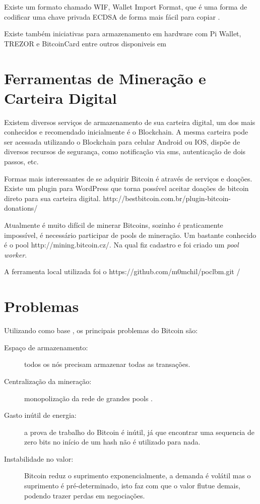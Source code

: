 \documentclass[a4paper,11pt]{article}
\theoremstyle{mytheor}
\begin{document}
Existe um formato chamado WIF, Wallet Import Format, que é uma forma de codificar uma chave privada ECDSA de forma mais fácil para copiar \cite{wif}. 

Existe também iniciativas para armazenamento em hardware com Pi Wallet, TREZOR e BitcoinCard entre outros disponiveis em \cite{hardWallet}

\section{Ferramentas de Mineração e Carteira Digital}

Existem diversos serviços de armazenamento de sua carteira digital, um dos mais conhecidos e recomendado inicialmente é o Blockchain. A mesma carteira pode ser acessada utilizando o Blockchain para celular Android ou IOS, dispõe de diversos recursos de segurança, como notificação via sms, autenticação de dois passos, etc.

Formas mais interessantes de se adquirir Bitcoin é através de serviços e doações. Existe um plugin para WordPress que torna possível aceitar doações de bitcoin direto para sua carteira digital. http://bestbitcoin.com.br/plugin-bitcoin-donations/

Atualmente é muito difícil de minerar Bitcoins, sozinho é praticamente impossível, é necessário participar de pools de mineração. Um bastante conhecido é o pool http://mining.bitcoin.cz/. Na qual fiz cadastro e foi criado um \textit{pool worker}.

A ferramenta local utilizada foi o https://github.com/m0mchil/poclbm.git /


\section*{Problemas}
Utilizando como base \cite{hardProblems}, os principais problemas do Bitcoin são:

\begin{description}
\item[Espaço de armazenamento:] todos os nós precisam armazenar todas as transações.
\item[Centralização da mineração:] monopolização da rede de grandes pools \cite{pools}.
\item[Gasto inútil de energia:] a prova de trabalho do Bitcoin é inútil, já que encontrar uma sequencia de zero bits no início de um hash não é utilizado para nada. 

\item[Instabilidade no valor:] Bitcoin reduz o suprimento exponencialmente, a demanda é volátil mas o suprimento é pré-determinado, isto faz com que o valor flutue demais, podendo trazer perdas em negociações.
\end{description}
\end{document}
